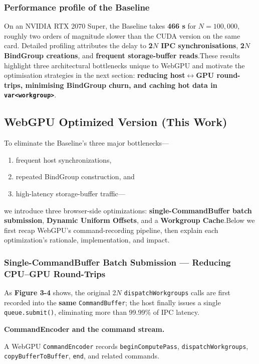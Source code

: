 \documentclass[PhD]{PHlab-thesis}
\begin{document}
\subsubsection{Performance profile of the Baseline}
On an NVIDIA RTX 2070 Super, the Baseline takes \textbf{466 s} for $N=100,000$, roughly two orders of magnitude slower than the CUDA version on the same card.
Detailed profiling attributes the delay to \textbf{2$N$ IPC synchronisations}, \textbf{2$N$ BindGroup creations}, and \textbf{frequent storage-buffer reads}.These results highlight three architectural bottlenecks unique to WebGPU and motivate the optimisation strategies in the next section: \textbf{reducing host$\leftrightarrow$GPU round-trips, minimising BindGroup churn, and caching hot data in \texttt{var<workgroup>}}.

\subsection{WebGPU Optimized Version (This Work)}
To eliminate the Baseline’s three major bottlenecks—
\begin{enumerate}
    \item frequent host synchronizations,
    \item repeated BindGroup construction, and
    \item high-latency storage-buffer traffic—
\end{enumerate}
we introduce three browser-side optimizations: \textbf{single-CommandBuffer batch submission}, \textbf{Dynamic Uniform Offsets}, and a \textbf{Workgroup Cache}.Below we first recap WebGPU’s command-recording pipeline, then explain each optimization’s rationale, implementation, and impact.

\subsubsection{Single-CommandBuffer Batch Submission — Reducing CPU–GPU Round-Trips}
As \textbf{Figure 3-4} shows, the original 2$N$ \texttt{dispatchWorkgroups} calls are first recorded into the \textbf{same} \texttt{CommandBuffer}; the host finally issues a single \texttt{queue.submit()}, eliminating more than 99.99\% of IPC latency.

\textbf{CommandEncoder and the command stream.}

A WebGPU \texttt{CommandEncoder} records \texttt{beginComputePass}, \texttt{dispatchWorkgroups}, \texttt{copyBufferToBuffer}, \texttt{end}, and related commands.
\end{document}
